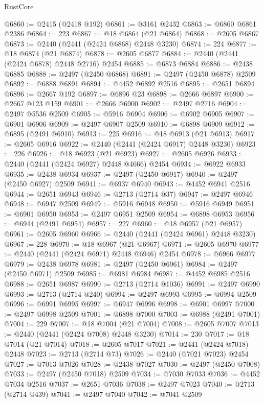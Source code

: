 \begin{lexlean}{RustCore}
\begin{coremodule}
@6860 := @2415 (@2418 @192)
@6861 := @3161 @2432
@6863 := @6860 @6861 @2386
@6864 := 223
@6867 := @18 @6864 (@21 @6864)
@6868 := @2605 @6867
@6873 := @2440 (@2441 (@2424 @6868) @2448 @3230)
@6874 := 224
@6877 := @18 @6874 (@21 @6874)
@6878 := @2605 @6877
@6884 := @2440 (@2441 (@2424 @6878) @2448 @2716) @2454
@6885 := @6873 @6884
@6886 := @2438 @6885
@6888 := @2497 (@2450 @6868)
@6891 := @2497 (@2450 @6878) @2509
@6892 := @6888 @6891
@6894 := @4452 @6892 @2516
@6895 := @2651 @6894
@6896 := @2667 @192
@6897 := @6896 @23
@6898 := @2666 @6897
@6900 := @2667 @123 @159
@6901 := @2666 @6900
@6902 := @2497 @2716
@6904 := @2497 @5536 @2509
@6905 := @5916 @6904
@6906 := @6902 @6905
@6907 := @6901 @6906
@6909 := @2497 @6907 @2509
@6910 := @6898 @6909
@6912 := @6895 (@2491 @6910)
@6913 := 225
@6916 := @18 @6913 (@21 @6913)
@6917 := @2605 @6916
@6922 := @2440 (@2441 (@2424 @6917) @2448 @3230)
@6923 := 226
@6926 := @18 @6923 (@21 @6923)
@6927 := @2605 @6926
@6933 := @2440 (@2441 (@2424 @6927) @2448 @4666) @2454
@6934 := @6922 @6933
@6935 := @2438 @6934
@6937 := @2497 (@2450 @6917)
@6940 := @2497 (@2450 @6927) @2509
@6941 := @6937 @6940
@6943 := @4452 @6941 @2516
@6944 := @2651 @6943
@6946 := @2713 (@2714 @37)
@6947 := @2497 @6946
@6948 := @6947 @2509
@6949 := @5916 @6948
@6950 := @5916 @6949
@6951 := @6901 @6950
@6953 := @2497 @6951 @2509
@6954 := @6898 @6953
@6956 := @6944 (@2491 @6954)
@6957 := 227
@6960 := @18 @6957 (@21 @6957)
@6961 := @2605 @6960
@6966 := @2440 (@2441 (@2424 @6961) @2448 @3230)
@6967 := 228
@6970 := @18 @6967 (@21 @6967)
@6971 := @2605 @6970
@6977 := @2440 (@2441 (@2424 @6971) @2448 @6946) @2454
@6978 := @6966 @6977
@6979 := @2438 @6978
@6981 := @2497 (@2450 @6961)
@6984 := @2497 (@2450 @6971) @2509
@6985 := @6981 @6984
@6987 := @4452 @6985 @2516
@6988 := @2651 @6987
@6990 := @2713 (@2714 @1036)
@6991 := @2497 @6990
@6993 := @2713 (@2714 @240)
@6994 := @2497 @6993
@6995 := @6994 @2509
@6996 := @6991 @6995
@6997 := @6947 @6996
@6998 := @6901 @6997
@7000 := @2497 @6998 @2509
@7001 := @6898 @7000
@7003 := @6988 (@2491 @7001)
@7004 := 229
@7007 := @18 @7004 (@21 @7004)
@7008 := @2605 @7007
@7013 := @2440 (@2441 (@2424 @7008) @2448 @3230)
@7014 := 230
@7017 := @18 @7014 (@21 @7014)
@7018 := @2605 @7017
@7021 := @2441 (@2424 @7018) @2448
@7023 := @2713 (@2714 @73)
@7026 := @2440 (@7021 @7023) @2454
@7027 := @7013 @7026
@7028 := @2438 @7027
@7030 := @2497 (@2450 @7008)
@7033 := @2497 (@2450 @7018) @2509
@7034 := @7030 @7033
@7036 := @4452 @7034 @2516
@7037 := @2651 @7036
@7038 := @2497 @7023
@7040 := @2713 (@2714 @439)
@7041 := @2497 @7040
@7042 := @7041 @2509

\end{coremodule}
\end{lexlean}

